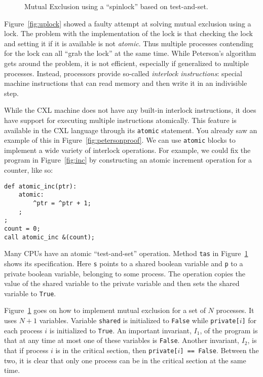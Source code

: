 \documentclass{report}
\newenvironment{code}{
\tcolorbox
}{
\endtcolorbox
}
\begin{document}
\begin{figure}
\begin{code}

\end{code}
\caption{Mutual Exclusion using a ``spinlock'' based on test-and-set.}
\label{fig:tas}
\end{figure}

Figure~\ref{fig:uplock} showed a faulty attempt at solving mutual
exclusion using a lock.  The problem with the implementation of the
lock is that checking the lock and setting it if it is available is
not \emph{atomic}.  Thus multiple processes contending for the lock
can all ``grab the lock'' at the same time.  While Peterson's
algorithm gets around the problem, it is not efficient, especially
if generalized to multiple processes.  Instead, processors provide
so-called \emph{interlock instructions}: special machine instructions
that can read memory and then write it in an indivisible step.

While the CXL machine does not have any built-in interlock instructions,
it does have support for executing multiple instructions atomically.
This feature is available in the CXL language through its \texttt{atomic}
statement.
You already saw an example of this in Figure~\ref{fig:petersonproof}.
We can use \texttt{atomic} blocks to implement a wide variety of
interlock operations.
For example, we could fix the program in Figure~\ref{fig:inc} by
constructing an atomic increment operation for a counter, like so:
\begin{code}
\begin{verbatim}
def atomic_inc(ptr):
    atomic:
        ^ptr = ^ptr + 1;
    ;
;
count = 0;
call atomic_inc &(count);
\end{verbatim}
\end{code}

Many CPUs have an atomic ``test-and-set'' operation.
Method \texttt{tas} in Figure~\ref{fig:tas} shows its specification.
Here \texttt{s} points to a shared boolean variable and \texttt{p}
to a private boolean variable, belonging to some process.
The operation copies the value of the shared variable to the
private variable and then sets the shared variable to \texttt{True}.

Figure~\ref{fig:tas} goes on how to implement mutual exclusion for
a set of $N$ processes.
It uses $N+1$ variables.
Variable \texttt{shared} is initialized to \texttt{False} while
\texttt{private[$i$]} for each process $i$ is initialized to \texttt{True}.
An important invariant, $I_1$, of the program is that at any time at most
one of these variables is \texttt{False}.
Another invariant, $I_2$, is that if process $i$ is in the critical section,
then \texttt{private[$i$] == False}.
Between the two, it is clear that only one process can be in the
critical section at the same time.
\end{document}
